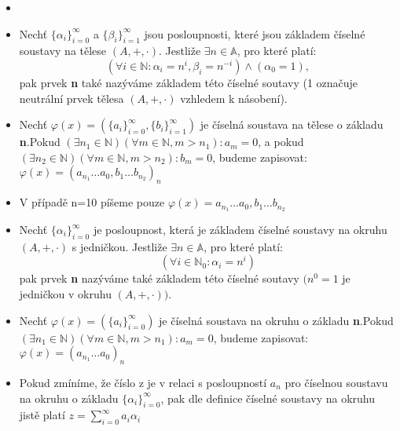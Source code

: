 \documentclass[czech,bachelor,dept470,male]{diploma}
\newcommand{\poslbeta}{\{\beta_i\}_{i=1}^{\infty}}
\newcommand{\poslalpha}{\{\alpha_i\}_{i=0}^{\infty}}
\newcommand{\posla}{\{a_i\}_{i=0}^{\infty}}
\newcommand{\poslb}{\{b_i\}_{i=1}^{\infty}}
\begin{document}
\begin{agreement}\label{u1}
	\begin{itemize}
		\item[]
		\item Nechť $\poslalpha$ a $\poslbeta$  jsou posloupnosti, které jsou základem číselné soustavy na tělese $(A,+,\cdot)$. Jestliže $\exists n \in \mathbb{A}$, pro které platí:
		$$ (\forall i \in \mathbb{N} : \alpha_i = n^i,\beta_i = n^{-i}) \land (\alpha_{0} = 1),$$
		pak prvek \textbf{n} také nazýváme základem této číselné soutavy (1 označuje neutrální prvek tělesa $(A,+,\cdot)$ vzhledem k násobení).
		\item Nechť $\varphi(x) = (\posla,\poslb)$ je číselná soustava na tělese o základu \textbf{n}.\newline Pokud $(\exists n_1 \in \mathbb{N}) (\forall m \in \mathbb{N},m>n_1):a_m = 0$, a pokud $(\exists n_2 \in \mathbb{N}) (\forall m \in \mathbb{N},m>n_2):b_m = 0$, budeme zapisovat: $\varphi(x) = (a_{n_1} \dots a_0,b_1 \dots b_{n_2})_n$
		\item V případě n=10 píšeme pouze $\varphi(x) = a_{n_1} \dots a_0,b_1 \dots b_{n_2}$
		\item Nechť $\poslalpha$ je posloupnost, která je základem číselné soustavy na okruhu $(A,+,\cdot)$ s jedničkou. Jestliže $\exists n \in \mathbb{A}$, pro které platí:
		$$ (\forall i \in \mathbb{N}_0 : \alpha_i = n^i)$$
		pak prvek \textbf{n} nazýváme také základem této číselné soutavy $(n^0=1$ je jedničkou v okruhu $(A,+,\cdot))$.
		\item Nechť $\varphi(x) = (\posla)$ je číselná soustava na okruhu o základu \textbf{n}.\newline Pokud $(\exists n_1 \in \mathbb{N}) (\forall m \in \mathbb{N},m>n_1):a_m = 0$, budeme zapisovat: $\varphi(x) = (a_{n_1} \dots a_0)_n$
		\item Pokud zmíníme, že číslo z je v relaci s posloupností $a_n$ pro číselnou soustavu na okruhu o základu $\{\alpha_i\}_{i=0}^\infty$, pak dle definice číselné soustavy na okruhu jistě platí $z = \sum_{i=0}^{\infty} a_{i}\alpha_{i}$
		\end{itemize}
\end{agreement}

\newpage
\end{document}
